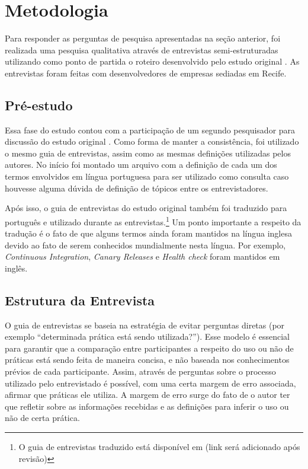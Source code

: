 
\section{Metodologia}
Para responder as perguntas de pesquisa apresentadas na seção anterior, foi realizada uma pesquisa qualitativa através de entrevistas semi-estruturadas utilizando como ponto de partida o roteiro desenvolvido pelo estudo original \cite{empiricalStudy2016}. As entrevistas foram feitas com desenvolvedores de empresas sediadas em Recife.


\subsection{Pré-estudo}
Essa fase do estudo contou com a participação de um segundo pesquisador para discussão do estudo original \cite{empiricalStudy2016}. Como forma de manter a consistência, foi utilizado o mesmo guia de entrevistas, assim como as mesmas definições utilizadas pelos autores. No início foi montado um arquivo com a definição de cada um dos termos envolvidos em língua portuguesa para ser utilizado como consulta caso houvesse alguma dúvida de definição de tópicos entre os entrevistadores.

Após isso, o guia de entrevistas do estudo original também foi traduzido para português e utilizado durante as entrevistas.\footnote{O guia de entrevistas traduzido está disponível em (link será adicionado após revisão)} Um ponto importante a respeito da tradução é o fato de que alguns termos ainda foram mantidos na língua inglesa devido ao fato de serem conhecidos mundialmente nesta língua. Por exemplo, \emph{Continuous Integration}, \emph{Canary Releases} e \emph{Health check} foram mantidos em inglês.

\subsection{Estrutura da Entrevista}

O guia de entrevistas se baseia na estratégia de evitar perguntas diretas (por exemplo “determinada prática está sendo utilizada?”). Esse modelo é essencial para garantir que a comparação entre participantes a respeito do uso ou não de práticas está sendo feita de maneira concisa, e não baseada nos conhecimentos prévios de cada participante. Assim, através de perguntas sobre o processo utilizado pelo entrevistado é possível, com uma certa margem de erro associada, afirmar que práticas ele utiliza. A margem de erro surge do fato de o autor ter que refletir sobre as informações recebidas e as definições para inferir o uso ou não de certa prática.

